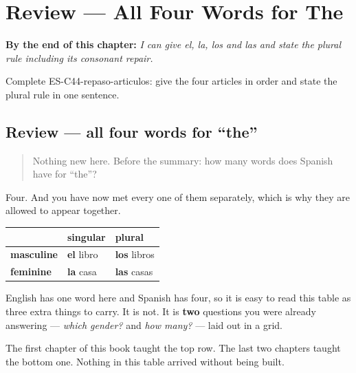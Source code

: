 
\chapter{Review --- All Four Words for The}
\label{ch:review-articles}

\begin{chapteropening}
\textbf{By the end of this chapter:} \emph{I can give el, la, los and las and state the plural rule including its consonant repair.}

Complete ES-C44-repaso-articulos: give the four articles in order and state the plural rule in one sentence.
\end{chapteropening}

\section[Practice]{Review — all four words for \textquotedblleft{}the\textquotedblright{}}

\label{lesson:ES-C44-repaso-articulos}



\begin{quote}
Nothing new here. Before the summary: how many words does Spanish have for \textquotedblleft{}the\textquotedblright{}?
\end{quote}

\begin{grammarlens}[title={What you've built}]
Four. And you have now met every one of them separately, which is why they are allowed to appear together.

\noindent
\begin{tabularx}{\linewidth}{@{}>{\raggedright\arraybackslash}X>{\raggedright\arraybackslash}X>{\raggedright\arraybackslash}X@{}}
\toprule
\textbf{} & \textbf{singular} & \textbf{plural} \\
\midrule
\textbf{masculine} & \textbf{el} libro & \textbf{los} libros \\
\textbf{feminine} & \textbf{la} casa & \textbf{las} casas \\
\bottomrule
\end{tabularx}

English has one word here and Spanish has four, so it is easy to read this table as three extra things to carry. It is not. It is \textbf{two} questions you were already answering — \emph{which gender?} and \emph{how many?} — laid out in a grid.

The first chapter of this book taught the top row. The last two chapters taught the bottom one. Nothing in this table arrived without being built.
\end{grammarlens}

